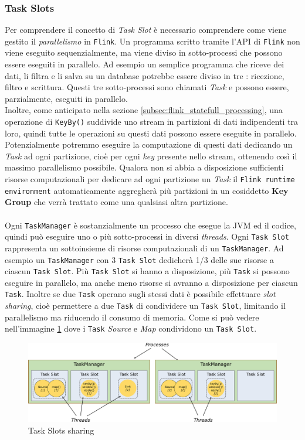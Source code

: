 \subsubsection{Task Slots}
\label{subsubsec:flink_Task_slots}
Per comprendere il concetto di \textit{Task Slot} è necessario comprendere come viene gestito il \textit{parallelismo} in \texttt{Flink}.    
Un programma scritto tramite l'API di \texttt{Flink} non viene eseguito sequenzialmente, ma viene diviso in sotto-processi che possono essere eseguiti in parallelo.
Ad esempio un semplice programma che riceve dei dati, li filtra e li salva su un database potrebbe essere diviso in tre : ricezione, filtro e scrittura.
Questi tre sotto-processi sono chiamati \textit{Task} e possono essere, parzialmente, eseguiti in parallelo.\\
Inoltre, come anticipato nella sezione \ref{subsec:flink_statefull_processing}, una operazione di \texttt{KeyBy()} suddivide uno stream in partizioni di dati
indipendenti tra loro, quindi tutte le operazioni su questi dati possono essere eseguite in parallelo.
Potenzialmente potremmo eseguire la computazione di questi dati dedicando un \textit{Task} ad ogni partizione, cioè per ogni \textit{key} presente nello stream,
ottenendo così il massimo parallelismo possibile.
Qualora non si abbia a disposizione sufficienti risorse computazionali per dedicare ad ogni partizione un \textit{Task} il \texttt{Flink runtime environment} 
automaticamente aggregherà più partizioni in un cosiddetto \textbf{Key Group} che verrà trattato come una qualsiasi altra partizione.
\\\\
Ogni \texttt{TaskManager} è sostanzialmente un processo che esegue la JVM ed il codice, quindi può eseguire uno o più sotto-processi in diversi \textit{threads}.
Ogni \texttt{Task Slot} rappresenta un sottoinsieme di risorse computazionali di un \texttt{TaskManager}.
Ad esempio un \texttt{TaskManager} con 3 \texttt{Task Slot} dedicherà 1/3 delle sue risorse a ciascun \texttt{Task Slot}.
Più \texttt{Task Slot} si hanno a disposizione, più \texttt{Task} si possono eseguire in parallelo, ma anche meno risorse si avranno a disposizione per ciascun \texttt{Task}.
Inoltre se due \texttt{Task} operano sugli stessi dati è possibile effettuare \textit{slot sharing}, cioè permettere a due \texttt{Task} di condividere un \texttt{Task Slot}, limitando il parallelismo ma riducendo il consumo di memoria.
Come si può vedere nell'immagine \ref{fig:flink_slots} dove i \texttt{Task} \textit{Source} e \textit{Map} condividono un \texttt{Task Slot}.
\begin{figure}[htbp]
    \centering
    \includegraphics[width=\textwidth]{images/flink/Tasks_slots.jpg}
    \caption{Task Slots sharing}
    \label{fig:flink_slots}
\end{figure}

